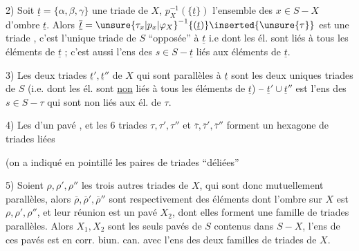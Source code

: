 2) Soit $\underline t=\{\alpha,\beta,\gamma\}$ une triade de $X$, $p_X^{-1}(\{\underline t\})$ l'ensemble des $x\in S-X$ d'ombre $\underline t$. Alors $\overline{\underline t}={\unsure{\tau_x|p_x|\varphi_X}}^{-1}\{(\underline t)\}\inserted{\unsure{\tau}}$ est une triade , c'est l'unique triade \inserted{$\overline\tau$} de $S$ ``opposée'' à $\underline t$ i.e  dont les él. sont  liés à tous les éléments de $\underline t$ ; c'est aussi l'ens des $s\in S-\underline t$  liés aux éléments de $\underline t$. 

3) Les deux triades $\underline t',\underline t''$ de  $X$ qui sont parallèles à $\underline t$  sont les deux uniques triades de $S$   (i.e. dont les él. sont \uline{non} liés à tous les éléments de $\underline t$) -- $\underline t'\cup\underline t''$ est l'ens des $s\in S-\tau$ qui sont non liés aux él. de $\tau$.

4) Les   d'un pavé , et les 6 triades $\tau,\tau',\tau''$ et $\overline\tau,\overline\tau',\overline\tau''$ forment un hexagone de triades liées


(on a indiqué en pointillé les paires de triades ``déliées'' 


5) Soient $\rho,\rho',\rho''$ les trois autres triades de $X$, qui sont donc mutuellement parallèles, alors $\overline\rho,\overline\rho',\overline\rho''$ sont  respectivement des éléments dont l'ombre sur $X$ est $\rho,\rho',\rho''$, et leur réunion est un pavé $X_2$, dont elles forment une famille de triades parallèles.
Alors $X_1,X_2$ sont les seuls pavés de $S$ contenus dans $S-X$,   l'ens  de ces pavés est en corr. biun. can. avec l'ens \inserted{$\varepsilon$} des deux familles de triades de $X$.

